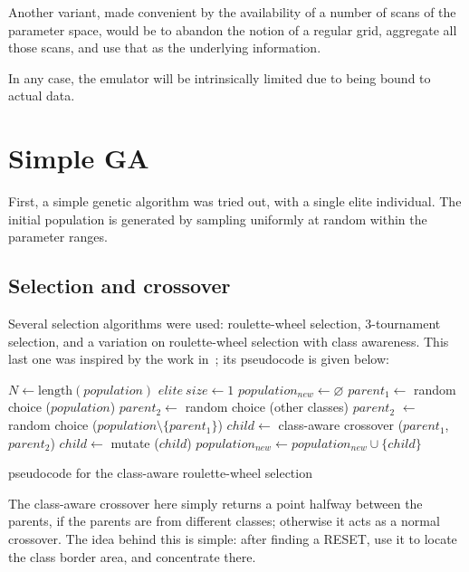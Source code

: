 \documentclass[times, utf8, diplomski]{fer}
\begin{document}
Another variant, made convenient by the availability of a number of scans of the
parameter space, would be to abandon the notion of a regular grid, aggregate all
those scans, and use that as the underlying information.


In any case, the emulator will be intrinsically limited due to being bound to
actual data.




\section{Simple GA}
First, a simple genetic algorithm was tried out, with a single elite individual.
The initial population is generated by sampling uniformly at random within the
parameter ranges.

\subsection{Selection and crossover}
Several selection algorithms were used: roulette-wheel selection, 3-tournament
selection, and a variation on roulette-wheel selection with class awareness.
This last one was inspired by the work in~\cite{GlitchItIfYouCan}; its
pseudocode is given below:
\begin{algorithm}
    \small
    \begin{algorithmic}
    \STATE $N \gets \text{length}(population)$
    \STATE $elite\ size \gets 1$
    \STATE $population_{new} \gets \varnothing$
        \STATE $parent_1  \gets$ random choice ($population$)
            \STATE $parent_2 \gets$ random choice (other classes)
        \ELSE
            \STATE $parent_2$ $\gets$ random choice ($population \setminus \{parent_1\}$)
        \ENDIF
        \STATE $child \gets$ class-aware crossover ($parent_1$, $parent_2$)
        \STATE $child \gets$ mutate ($child$)
        \STATE $population_{new} \gets population_{new} \cup \{child\} $
    \ENDFOR
    \end{algorithmic}
    \caption{pseudocode for the class-aware roulette-wheel selection}
\end{algorithm}

The class-aware crossover here simply returns a point halfway between the parents,
if the parents are from different classes; otherwise it acts as a normal crossover.
The idea behind this is simple: after finding a RESET, use it to locate the class
border area, and concentrate there.
\end{document}

